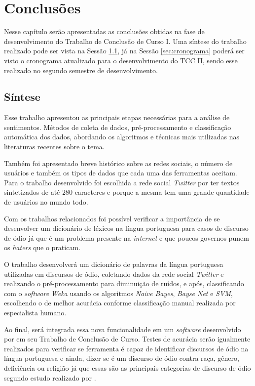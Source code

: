 \chapter{Conclusões}
\label{cap:conclusoes}
Nesse capítulo serão apresentadas as conclusões obtidas na fase de desenvolvimento do Trabalho de Conclusão de Curso I. Uma síntese do trabalho realizado pode ser vista na Sessão \ref{sec:sintese}, já na Sessão \ref{sec:cronograma} poderá ser visto o cronograma atualizado para o desenvolvimento do TCC II, sendo esse realizado no segundo semestre de desenvolvimento.

\section{Síntese}
\label{sec:sintese}

Esse trabalho apresentou as principais etapas necessárias para a análise de sentimentos. Métodos de coleta de dados, pré-processamento e classificação automática dos dados, abordando os algoritmos e técnicas mais utilizadas nas literaturas recentes sobre o tema.

Também foi apresentado breve histórico sobre as redes sociais, o número de usuários e também os tipos de dados que cada uma das ferramentas aceitam. Para o trabalho desenvolvido foi escolhida a rede social \textit{Twitter} por ter textos sintetizados de até $280$ caracteres e porque a mesma tem uma grande quantidade de usuários no mundo todo.

Com os trabalhos relacionados foi possível verificar a importância de se desenvolver um dicionário de léxicos na língua portuguesa para casos de discurso de ódio já que é um problema presente na \textit{internet} e que poucos governos punem os \textit{haters} que o praticam.

O trabalho desenvolverá um dicionário de palavras da língua portuguesa utilizadas em discursos de ódio, coletando dados da rede social \textit{Twitter} e realizando o pré-processamento para diminuição de ruídos, e após, classificando com o \textit{software} \textit{Weka} usando os algoritmos \textit{Naive Bayes}, \textit{Bayse Net} e \textit{SVM}, escolhendo o de melhor acurácia conforme classificação manual realizada por especialista humano.

Ao final, será integrada essa nova funcionalidade em um \textit{software} desenvolvido por  em seu Trabalho de Conclusão de Curso. Testes de acurácia serão igualmente realizados para verificar se ferramenta é capaz de identificar discursos de ódio na língua portuguesa e ainda, dizer se é um discurso de ódio contra raça, gênero, deficiência ou religião já que essas são as principais categorias de discurso de ódio segundo estudo realizado por .

